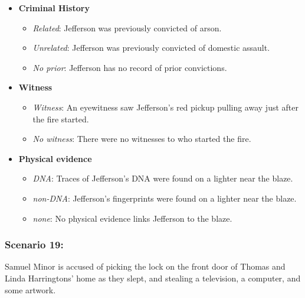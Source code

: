 \documentclass[
]{article}
\providecommand{\tightlist}{%
  \setlength{\itemsep}{0pt}\setlength{\parskip}{0pt}}
\begin{document}
\begin{itemize}
\tightlist
\item
  \textbf{Criminal History}

  \begin{itemize}
  \tightlist
  \item
    \emph{Related}: Jefferson was previously convicted of arson.
  \item
    \emph{Unrelated}: Jefferson was previously convicted of domestic
    assault.
  \item
    \emph{No prior}: Jefferson has no record of prior convictions.
  \end{itemize}
\item
  \textbf{Witness}

  \begin{itemize}
  \tightlist
  \item
    \emph{Witness}: An eyewitness saw Jefferson's red pickup pulling
    away just after the fire started.
  \item
    \emph{No witness}: There were no witnesses to who started the fire.
  \end{itemize}
\item
  \textbf{Physical evidence}

  \begin{itemize}
  \tightlist
  \item
    \emph{DNA}: Traces of Jefferson's DNA were found on a lighter near
    the blaze.
  \item
    \emph{non-DNA}: Jefferson's fingerprints were found on a lighter
    near the blaze.
  \item
    \emph{none}: No physical evidence links Jefferson to the blaze.
  \end{itemize}
\end{itemize}

\hypertarget{scenario-19}{%
\subsubsection{Scenario 19:}\label{scenario-19}}

Samuel Minor is accused of picking the lock on the front door of Thomas
and Linda Harringtons' home as they slept, and stealing a television, a
computer, and some artwork.
\end{document}
